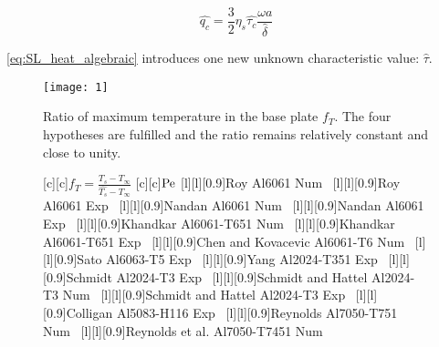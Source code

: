 \documentclass[review, 1p, number, sort&compress,table]{elsarticle}
\begin{document}
\begin{equation}\label{eq:SL_heat_algebraic}
            \widehat{q_c}=\frac 32\eta_s\widehat{\tau_c}\frac{\omega
            a}{\widehat{\delta}}
\end{equation}

\autoref{eq:SL_heat_algebraic} introduces one new unknown characteristic value: $\widehat{\tau}$.

\ifpdf
	\begin{figure*}[ht!]
				\centering	
				\texttt{[image: 1]}
			\caption{Ratio of maximum temperature in the base plate $f_T$. The four hypotheses are fulfilled and the ratio
				remains relatively constant and close to unity.}	
			\label{fig:theta-pe}
	\end{figure*}
\else
		\begin{figure*}[!h]
		\centering
				[c][c]{$f_T=\displaystyle \frac{T_s-T_{\infty}}{\widehat{T_s}-T_{\infty}}$}
				[c][c]{$\mbox{Pe}$}
				[l][l][0.9]{\scriptsize Roy \etal Al6061 Num~\cite{roy06}}
				[l][l][0.9]{\scriptsize Roy \etal Al6061 Exp~\cite{roy06}}
				[l][l][0.9]{\scriptsize Nandan \etal Al6061 Num~\cite{nandan06mmta1247}}
				[l][l][0.9]{\scriptsize Nandan \etal Al6061 Exp~\cite{nandan06mmta1247}}
				[l][l][0.9]{\scriptsize Khandkar \etal Al6061-T651 Num~\cite{khandkar03}}
				[l][l][0.9]{\scriptsize Khandkar \etal Al6061-T651 Exp~\cite{khandkar03}}
				[l][l][0.9]{\scriptsize Chen and Kovacevic Al6061-T6 Num~\cite{chen03mtm1319}}
				[l][l][0.9]{\scriptsize Sato \etal Al6063-T5 Exp~\cite{sato02}}
				[l][l][0.9]{\scriptsize Yang \etal Al2024-T351 Exp~\cite{yang04}}
				[l][l][0.9]{\scriptsize Schmidt \etal Al2024-T3 Exp~\cite{schmidt04msmse143}}
				[l][l][0.9]{\scriptsize Schmidt and Hattel Al2024-T3 Num~\cite{schmidt05stwj177}}
				[l][l][0.9]{\scriptsize Schmidt and Hattel Al2024-T3 Exp~\cite{schmidt05msms77}}
				[l][l][0.9]{\scriptsize Colligan Al5083-H116 Exp~\cite{colligan07}}
				[l][l][0.9]{\scriptsize Reynolds \etal Al7050-T751 Num~\cite{reynolds03msf2959}}
				[l][l][0.9]{\scriptsize Reynolds et al. Al7050-T7451 Num~\cite{reynolds05stwj190}}

\end{figure*}
\end{document}
